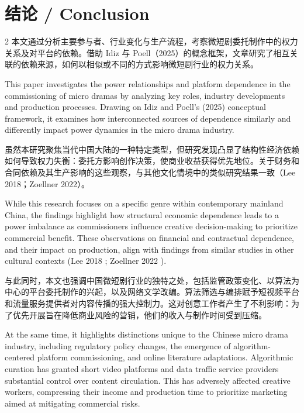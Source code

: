 \documentclass[10pt,a4paper]{article}
\begin{document}
\section*{结论 / Conclusion}
\begin{paracol}{2}
本文通过分析主要参与者、行业变化与生产流程，考察微短剧委托制作中的权力关系及对平台的依赖。借助 Idiz 与 Poell（2025）的概念框架，文章研究了相互关联的依赖来源，如何以相似或不同的方式影响微短剧行业的权力关系。\par
\switchcolumn
This paper investigates the power relationships and platform dependence in the commissioning of micro dramas by analyzing key roles, industry developments and production processes. Drawing on Idiz and Poell’s (2025) conceptual framework, it examines how interconnected sources of dependence similarly and differently impact power dynamics in the micro drama industry.\par
\switchcolumn*
虽然本研究聚焦当代中国大陆的一种特定类型，但研究发现凸显了结构性经济依赖如何导致权力失衡：委托方影响创作决策，使商业收益获得优先地位。关于财务和合同依赖及其生产影响的这些观察，与其他文化情境中的类似研究结果一致（Lee 2018；Zoellner 2022）。\par
\switchcolumn
While this research focuses on a specific genre within contemporary mainland China, the findings highlight how structural economic dependence leads to a power imbalance as commissioners influence creative decision-making to prioritize commercial benefit. These observations on financial and contractual dependence, and their impact on production, align with findings from similar studies in other cultural contexts (Lee 2018 ; Zoellner 2022 ).\par
\switchcolumn*
与此同时，本文也强调中国微短剧行业的独特之处，包括监管政策变化、以算法为中心的平台委托制作的兴起，以及网络文学改编。算法筛选与编排赋予短视频平台和流量服务提供者对内容传播的强大控制力。这对创意工作者产生了不利影响：为了优先开展旨在降低商业风险的营销，他们的收入与制作时间受到压缩。\par
\switchcolumn
At the same time, it highlights distinctions unique to the Chinese micro drama industry, including regulatory policy changes, the emergence of algorithm-centered platform commissioning, and online literature adaptations. Algorithmic curation has granted short video platforms and data traffic service providers substantial control over content circulation. This has adversely affected creative workers, compressing their income and production time to prioritize marketing aimed at mitigating commercial risks.\par

\end{paracol}
\end{document}
